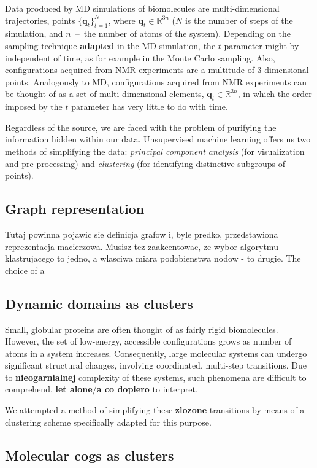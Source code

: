 Data produced by MD simulations of biomolecules are multi-dimensional trajectories, points $\{ \mathbf{q}_t \}_{t=1}^N$, where $\mathbf{q}_t\in\mathbb{R}^{3n}$ ($N$ is the number of steps of the simulation, and $n$~--~the number of atoms of the system).
Depending on the sampling technique {\bf adapted} in the MD simulation, the $t$ parameter might by independent of time, as for example in the Monte Carlo sampling.
Also, configurations acquired from NMR experiments are a multitude of 3-dimensional points.
Analogously to MD, configurations acquired from NMR experiments can be thought of as a set of multi-dimensional elements, $\mathbf{q}_t\in\mathbb{R}^{3n}$, in which the order imposed by the $t$ parameter has very little to do with time.

Regardless of the source, we are faced with the problem of purifying the information hidden within our data.
Unsupervised machine learning offers us two methods of simplifying the data: \emph{principal component analysis} (for visualization and pre-processing) and \emph{clustering} (for identifying distinctive subgroups of points).

\subsection{Graph representation}

Tutaj powinna pojawic sie definicja grafow i, byle predko, przedstawiona reprezentacja macierzowa.
Musisz tez zaakcentowac, ze wybor algorytmu klastrujacego to jedno, a wlasciwa miara podobienstwa nodow - to drugie.
The choice of a 

\subsection{Dynamic domains as clusters}

Small, globular proteins are often thought of as fairly rigid biomolecules.
However, the set of low-energy, accessible configurations grows as number of atoms in a system increases.
Consequently, large molecular systems can undergo significant structural changes, involving coordinated, multi-step transitions.
Due to {\bf nieogarnialnej} complexity of these systems, such phenomena are difficult to comprehend, {\bf let alone}/{\bf a co dopiero} to interpret.

We attempted a method of simplifying these {\bf zlozone} transitions by means of a clustering scheme specifically adapted for this purpose.


\subsection{Molecular cogs as clusters}
